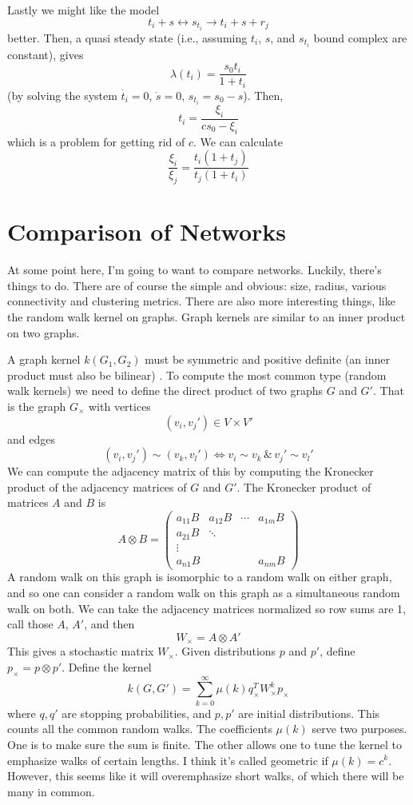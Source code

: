 \documentclass[10pt]{article}
\theoremstyle{definition}
\numberwithin{theorem}{section}
\numberwithin{definition}{section}
\numberwithin{lemma}{section}
\numberwithin{corollary}{section}
\numberwithin{clm}{section}
\numberwithin{rmk}{section}
\begin{document}
Lastly we might like the model 
\[
t_i + s \leftrightarrow s_{t_i} \rightarrow t_i + s + r_j
\] 
better. Then, a quasi steady state (i.e., assuming $t_i$, $s$, and $s_{t_i}$ bound complex are constant), gives
\[
\lambda(t_i) = \frac{s_0 t_i}{1 + t_i}
\]
(by solving the system $\dot{t_i} = 0$, $\dot{s} = 0$, 	$s_{t_i} = s_0 - s$). Then,
\[
t_i = \frac{\xi_i}{cs_0  - \xi_i} 
\]
which is a problem for getting rid of $c$. We can calculate
\[
\frac{\xi_i}{\xi_j} = \frac{t_i(1+t_j)}{t_j(1+t_i)}
\]

\section{Comparison of Networks}
At some point here, I'm going to want to compare networks. Luckily, there's things to do. There are of course the simple and obvious: size, radius, various connectivity and clustering metrics. There are also more interesting things, like the random walk kernel on graphs. Graph kernels are similar to an inner product on two graphs.

A graph kernel $k(G_1,G_2)$ must be symmetric and positive definite (an inner product must also be bilinear) \cite{Vishwanathan}. To compute the most common type (random walk kernels) we need to define the direct product of two graphs $G$ and $G'$. That is the graph $G_{\times}$ with vertices 
\[
(v_i,v_j') \in V \times V'
\]
and edges
\[
(v_i,v_j') \sim (v_k,v_l') \Leftrightarrow v_i \sim v_k \, \&\, v_j' \sim v_l'
\]
We can compute the adjacency matrix of this by computing the Kronecker product of the adjacency matrices of $G$ and $G'$. The Kronecker product of matrices $A$ and $B$ is
\[
A \otimes B = \begin{pmatrix}
a_{11} B & a_{12}B & \cdots & a_{1m}B\\
a_{21}B & \ddots & &\\
\vdots & & & \\
a_{n1}B & & & a_{nm}B
\end{pmatrix}
\]
A random walk on this graph is isomorphic to a random walk on either graph, and so one can consider a random walk on this graph as a simultaneous random walk on both. We can take the adjacency matrices normalized so row sums are 1, call those $A$, $A'$, and then
\[
W_{\times}  = A \otimes A'
\] 
This gives a stochastic matrix $W_{\times}$. Given distributions $p$ and $p'$, define $p_{\times}  = p \otimes p'$. Define the kernel
\[
k(G,G') = \sum_{k=0}^{\infty} \mu(k) q_{\times}^T W_{\times}^k p_{\times}
\]
where $q,q'$ are stopping probabilities, and $p,p'$ are initial distributions. This counts all the common random walks. The coefficients $\mu(k)$ serve two purposes. One is to make sure the sum is finite. The other allows one to tune the kernel to emphasize walks of certain lengths. I think it's called geometric if $\mu(k) = c^k$. However, this seems like it will overemphasize short walks, of which there will be many in common.

	


\end{document}
